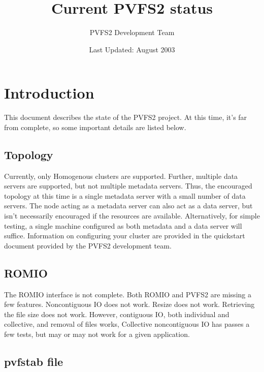 \documentclass[11pt, letterpaper]{article}
\title{Current PVFS2 status}
\author{ PVFS2 Development Team }
\date{ Last Updated: August 2003 }
\begin{document}
\maketitle

\tableofcontents

\newpage

\thispagestyle{empty}

\setlength{\parindent}{0.0cm}

\section{Introduction}

This document describes the state of the PVFS2 project.  At this time,
it's far from complete, so some important details are listed below.


\subsection{Topology}

Currently, only Homogenous clusters are supported.  Further, multiple
data servers are supported, but not multiple metadata servers.  Thus,
the encouraged topology at this time is a single metadata server with
a small number of data servers.  The node acting as a metadata server
can also act as a data server, but isn't necessarily encouraged if the
resources are available.  Alternatively, for simple testing, a single
machine configured as both metadata and a data server will suffice.
Information on configuring your cluster are provided in the quickstart
document provided by the PVFS2 development team.

\subsection{ROMIO}

The ROMIO interface is not complete.  Both ROMIO and PVFS2 are missing a few
features.  Noncontiguous IO does not work.   Resize does not work.   Retrieving
the file size does not work.  However, contiguous IO, both individual and
collective, and removal of files works,   Collective noncontiguous IO has
passes a few tests, but may or may not work for a given application.

\subsection{pvfstab file}
\end{document}
